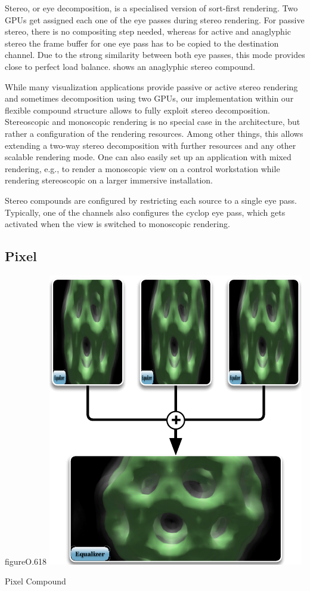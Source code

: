 Stereo, or eye decomposition, is a specialised version of sort-first rendering.
Two GPUs get assigned each one of the eye passes during stereo rendering. For
passive stereo, there is no compositing step needed, whereas for active and
anaglyphic stereo the frame buffer for one eye pass has to be copied to the
destination channel. Due to the strong similarity between both eye passes, this
mode provides close to perfect load balance.  shows an ana\-gly\-phic stereo compound.

While many visualization applications provide passive or active stereo rendering and
sometimes decomposition using two GPUs, our implementation within our flexible
compound structure allows to fully exploit stereo decomposition.  Stereoscopic
and monoscopic rendering is no special case in the architecture, but rather a
configuration of the rendering resources. Among other things, this allows
extending a two-way stereo decomposition with further resources and any other
scalable rendering mode. One can also easily set up an application with mixed
rendering, e.g., to render a monoscopic view on a control workstation while
rendering stereoscopic on a larger immersive installation.

Stereo compounds are configured by restricting each source to a single eye
pass. Typically, one of the channels also configures the \textsf{cyclop} eye
pass, which gets activated when the view is switched to monoscopic rendering.


\subsection{Pixel}

\begin{wrapfloat}{figure}{O}{.618\textwidth}
 \includegraphics[width=.618\textwidth]{images/Pixel}
 {\caption{\label{fPixel}Pixel Compound}}
\end{wrapfloat}

